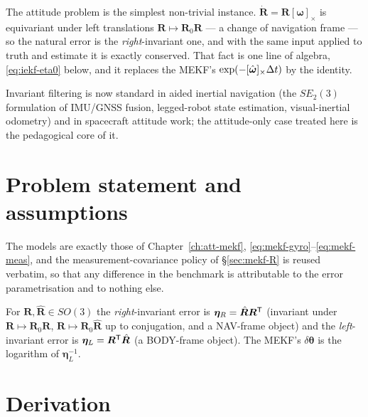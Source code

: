 The attitude problem is the simplest non-trivial instance. $\dot{\bm{R}}=\bm{R}[\bm{\omega}]_\times$
is equivariant under left translations $\bm{R}\mapsto\bm{R}_0\bm{R}$ --- a change of navigation frame
--- so the natural error is the \emph{right}-invariant one, and with the same input applied to truth
and estimate it is exactly conserved. That fact is one line of algebra, \eqref{eq:iekf-eta0} below,
and it replaces the MEKF's $\exp(-[\hat{\bm{\omega}}]_\times\Delta t)$ by the identity.

Invariant filtering is now standard in aided inertial navigation (the $SE_2(3)$ formulation of
IMU/GNSS fusion, legged-robot state estimation, visual-inertial odometry) and in spacecraft attitude
work; the attitude-only case treated here is the pedagogical core of it.

\section{Problem statement and assumptions}
The models are exactly those of Chapter~\ref{ch:att-mekf}, \eqref{eq:mekf-gyro}--\eqref{eq:mekf-meas},
and the measurement-covariance policy of \S\ref{sec:mekf-R} is reused verbatim, so that any
difference in the benchmark is attributable to the error parametrisation and to nothing else.

\begin{definition}
For $\bm{R},\hat{\bm{R}}\in SO(3)$ the \emph{right}-invariant error is
$\bm{\eta}_R=\hat{\bm{R}}\bm{R}^{\mathsf{T}}$ (invariant under $\bm{R}\mapsto\bm{R}_0\bm{R}$,
$\hat{\bm{R}}\mapsto\bm{R}_0\hat{\bm{R}}$ up to conjugation, and a NAV-frame object) and the
\emph{left}-invariant error is $\bm{\eta}_L=\bm{R}^{\mathsf{T}}\hat{\bm{R}}$ (a BODY-frame object). The MEKF's
$\delta\bm{\theta}$ is the logarithm of $\bm{\eta}_L^{-1}$.
\end{definition}

\section{Derivation}


